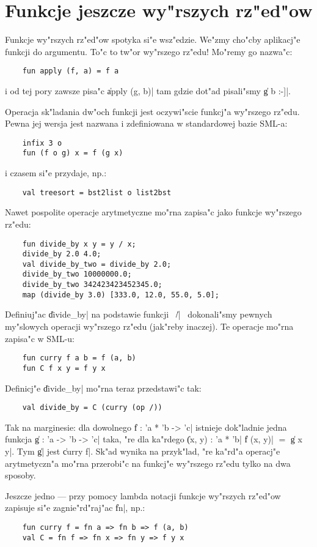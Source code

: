 \chapter{
Funkcje jeszcze wy"rszych rz"ed"ow 
}

Funkcje wy"rszych rz"ed"ow spotyka si"e wsz"edzie. We"zmy cho"cby
aplikacj"e funkcji do argumentu. To"c to tw"or wy"rszego rz"edu! Mo"remy go nazwa"c: 
\begin{verbatim}
    fun apply (f, a) = f a
\end{verbatim}
i od tej pory zawsze pisa"c \|apply (g, b)| tam gdzie dot"ad pisali"smy \|g b  :-]|.

Operacja sk"ladania dw"och funkcji jest oczywi"scie funkcj"a wy"rszego rz"edu. 
Pewna jej wersja jest nazwana i zdefiniowana w standardowej bazie SML-a:
\begin{verbatim}
    infix 3 o
    fun (f o g) x = f (g x)
\end{verbatim}
i czasem si"e przydaje, np.:
\begin{verbatim}
    val treesort = bst2list o list2bst
\end{verbatim}
Nawet pospolite operacje arytmetyczne mo"rna zapisa"c jako funkcje wy"rszego rz"edu:
\begin{verbatim}
    fun divide_by x y = y / x;
    divide_by 2.0 4.0;
    val divide_by_two = divide_by 2.0;
    divide_by_two 10000000.0;
    divide_by_two 342423423452345.0;
    map (divide_by 3.0) [333.0, 12.0, 55.0, 5.0];
\end{verbatim}

Definiuj"ac \|divide_by| na podstawie funkcji ~\|/|~ dokonali"smy pewnych
my\-"slo\-wych operacji wy"rszego rz"edu (jak"reby inaczej). 
Te operacje mo"rna zapisa"c w SML-u:
\begin{verbatim}
    fun curry f a b = f (a, b)
    fun C f x y = f y x
\end{verbatim}
Definicj"e \|divide_by| mo"rna teraz przedstawi"c tak:
\begin{verbatim}
    val divide_by = C (curry (op /))
\end{verbatim}

Tak na marginesie: dla dowolnego \|f : 'a * 'b -> 'c| istnieje dok"ladnie
jedna funkcja \|g : 'a -> 'b -> 'c| taka, "re dla ka"rdego \|(x, y) : 'a * 'b|
\|f (x, y)| $=$ \|g x y|. Tym \|g| jest \|curry f|. Sk"ad wynika na przyk"lad, "re ka"rd"a 
operacj"e arytmetyczn"a mo"rna przerobi"c na funkcj"e wy"rszego rz"edu tylko na dwa sposoby.

Jeszcze jedno --- przy pomocy lambda notacji
funkcje wy"rszych rz"ed"ow zapisuje si"e zagnie"rd"raj"ac \|fn|, np.:
\begin{verbatim}
    fun curry f = fn a => fn b => f (a, b)
    val C = fn f => fn x => fn y => f y x
\end{verbatim}


